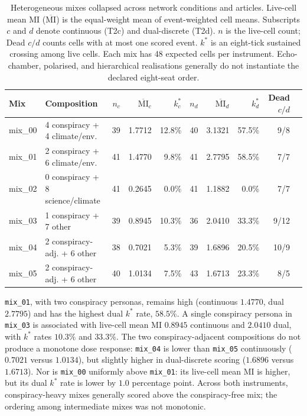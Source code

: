 \begin{table}[t]
\centering
\caption{Heterogeneous mixes collapsed across network conditions and articles.
Live-cell mean MI (\(\overline{\mathrm{MI}}\)) is the equal-weight mean of event-weighted
cell means. Subscripts \(c\) and \(d\) denote continuous (T2c) and dual-discrete (T2d).
\(n\) is the live-cell count; Dead \(c/d\) counts cells with at most one scored event.
\(k^{*}\) is an eight-tick sustained crossing among live cells. Each mix has 48 expected
cells per instrument. Echo-chamber, polarised, and hierarchical realisations generally
do not instantiate the declared eight-seat order.}
\label{tab:results-mixes}
\scriptsize
\begin{tabular}{llrrrrrrrr}
\toprule
Mix & Composition & \(n_c\) & \(\overline{\mathrm{MI}}_c\) & \(k^*_c\) &
\(n_d\) & \(\overline{\mathrm{MI}}_d\) & \(k^*_d\) & Dead \(c/d\) \\
\midrule
mix\_00 & 4 conspiracy + 4 climate/env. & 39 & 1.7712 & 12.8\% & 40 & 3.1321 & 57.5\% & 9/8 \\
mix\_01 & 2 conspiracy + 6 climate/env. & 41 & 1.4770 & 9.8\% & 41 & 2.7795 & 58.5\% & 7/7 \\
mix\_02 & 0 conspiracy + 8 science/climate & 41 & 0.2645 & 0.0\% & 41 & 1.1882 & 0.0\% & 7/7 \\
mix\_03 & 1 conspiracy + 7 other & 39 & 0.8945 & 10.3\% & 36 & 2.0410 & 33.3\% & 9/12 \\
mix\_04 & 2 conspiracy-adj. + 6 other & 38 & 0.7021 & 5.3\% & 39 & 1.6896 & 20.5\% & 10/9 \\
mix\_05 & 2 conspiracy-adj. + 6 other & 40 & 1.0134 & 7.5\% & 43 & 1.6713 & 23.3\% & 8/5 \\
\bottomrule
\end{tabular}
\end{table}

\texttt{mix\_01}, with two conspiracy personas, remains high (continuous
\(1.4770\), dual \(2.7795\)) and has the highest dual \(k^*\) rate,
\(58.5\%\).  A single conspiracy persona in \texttt{mix\_03} is associated
with live-cell mean MI \(0.8945\) continuous and \(2.0410\) dual, with \(k^*\) rates
\(10.3\%\) and \(33.3\%\).  The two conspiracy-adjacent compositions do not
produce a monotone dose response: \texttt{mix\_04} is lower than
\texttt{mix\_05} continuously (\(0.7021\) versus \(1.0134\)), but slightly
higher in dual-discrete scoring (\(1.6896\) versus \(1.6713\)).  Nor is
\texttt{mix\_00} uniformly above \texttt{mix\_01}: its live-cell mean MI is
higher, but its dual \(k^*\) rate is lower by \(1.0\) percentage point.
Across both instruments, conspiracy-heavy mixes generally scored above the
conspiracy-free mix; the ordering among intermediate mixes was not
monotonic.

